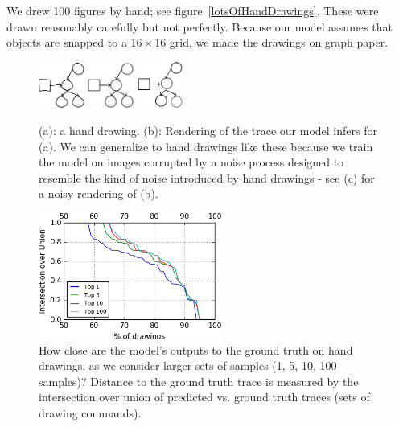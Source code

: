 \documentclass{article}
\begin{document}
We drew 100 figures by hand; see figure~\ref{lotsOfHandDrawings}.
These were drawn reasonably carefully but not perfectly.
Because our model assumes that objects are snapped to a $16\times 16$ grid,
we made the drawings on graph paper.
\begin{figure}\centering
  \begin{minipage}{0.45\textwidth}
  \begin{minipage}[t]{0.3\textwidth}\includegraphics[width = 1.5cm]{figures/expert-60-reduced.png}
    \subcaption{}
  \end{minipage}%
   \begin{minipage}[t]{0.3\textwidth}\includegraphics[width = 1.5cm]{figures/60-groundTruth-reduced.png}
    \subcaption{}
  \end{minipage}%
  \begin{minipage}[t]{0.3\textwidth}\includegraphics[width = 1.5cm]{figures/60-1-reduced.png}
    \subcaption{}
  \end{minipage}%
    \caption{(a): a hand drawing. (b): Rendering of the trace our model infers for (a). We can generalize to hand drawings like these because we train the model on images corrupted by a noise process designed to resemble the kind of noise introduced by hand drawings - see (c) for a noisy rendering of (b).}\label{handDrawingExamples}
  \end{minipage}\hfill
  \begin{minipage}{0.45\textwidth}
  \includegraphics[width = 6cm]{figures/drawingAccuracy.png}
  \caption{How close are the model's outputs to the ground truth on hand drawings, as we consider larger sets of samples (1, 5, 10, 100 samples)?
  Distance to the ground truth trace is measured by the intersection over union of predicted vs. ground truth traces (sets of drawing commands).}\label{drawingIntersectionOverUnion}
    \end{minipage}
\end{figure}
\end{document}
